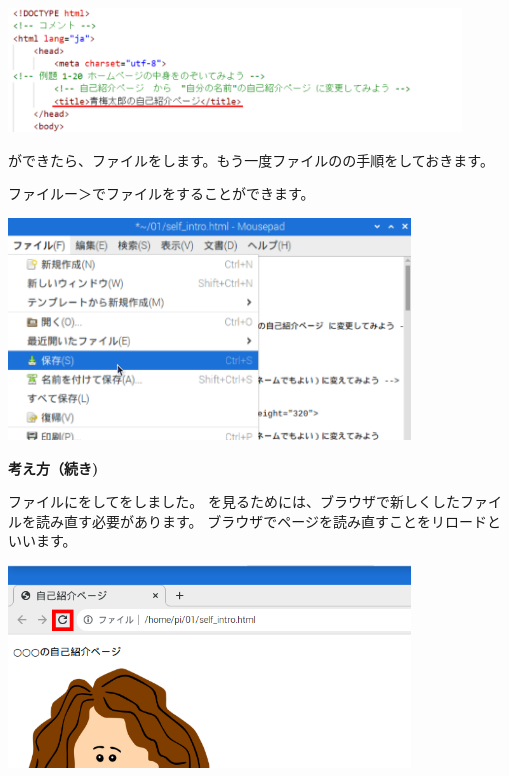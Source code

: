 \documentclass[a4paper,12pt]{jarticle}
\begin{document}
\centering
\includegraphics[width=0.9\textwidth]{textbook-img148.png}


\bigskip

\flushleft
{}ができたら、ファイルをします。もう一度ファイルのの手順をしておきます。

ファイルー＞でファイルをすることができます。



\centering
\includegraphics[width=0.8\textwidth]{textbook-img147.png}



\clearpage
\flushleft
\textbf{考え方（続き)}




ファイルにをしてをしました。
を見るためには、ブラウザで新しくしたファイルを読み直す必要があります。
ブラウザでページを読み直すことをリロードといいます。


\bigskip


\bigskip
\centering
\includegraphics[width=0.8\textwidth]{textbook-img149.png}
\end{document}
